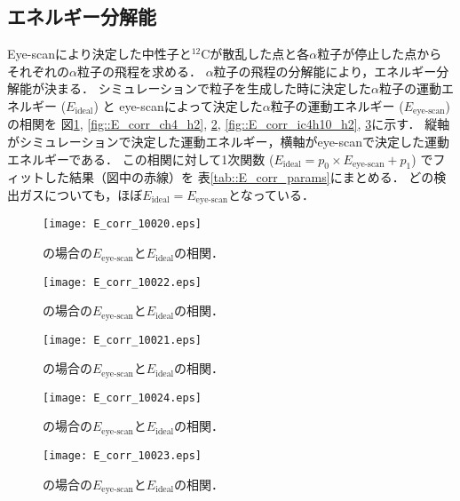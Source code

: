 \documentclass[../master]{subfiles}
\begin{document}
\subsection{エネルギー分解能}
Eye-scanにより決定した中性子と${}^{12}\mathrm{C}$が散乱した点と各$\alpha$粒子が停止した点から
それぞれの$\alpha$粒子の飛程を求める．
$\alpha$粒子の飛程の分解能により，エネルギー分解能が決まる．
シミュレーションで粒子を生成した時に決定した$\alpha$粒子の運動エネルギー ($E_{\text{ideal}}$) と
eye-scanによって決定した$\alpha$粒子の運動エネルギー ($E_{\text{eye-scan}}$) の相関を
図\ref{fig::E_corr_ch4}, \ref{fig::E_corr_ch4_h2}, \ref{fig::E_corr_ch4_he},
\ref{fig::E_corr_ic4h10_h2}, \ref{fig::E_corr_ic4h10_he}に示す．
縦軸がシミュレーションで決定した運動エネルギー，横軸がeye-scanで決定した運動エネルギーである．
この相関に対して1次関数 ($E_{\text{ideal}} = p_0\times E_{\text{eye-scan}}+p_1$) でフィットした結果（図中の赤線）を
表\ref{tab::E_corr_params}にまとめる．
どの検出ガスについても，ほぼ$E_{\text{ideal}} = E_{\text{eye-scan}}$となっている．
\begin{figure}
  \centering
  \begin{minipage}{0.45\columnwidth}
    \centering
    \texttt{[image: E\_corr\_10020.eps]}
    \caption{\Methane の場合の$E_{\text{eye-scan}}$と$E_{\text{ideal}}$の相関．}
    \label{fig::E_corr_ch4}
  \end{minipage}  
\end{figure}
\begin{figure}
  \centering
  \begin{minipage}{0.45\columnwidth}
    \centering
    \texttt{[image: E\_corr\_10022.eps]}
    \caption{\MethaneHydro の場合の$E_{\text{eye-scan}}$と$E_{\text{ideal}}$の相関．}
    \label{fig::E_corr_ch4_h2}
  \end{minipage}
  \begin{minipage}{0.45\columnwidth}
    \centering
    \texttt{[image: E\_corr\_10021.eps]}
    \caption{\MethaneHerium の場合の$E_{\text{eye-scan}}$と$E_{\text{ideal}}$の相関．}
    \label{fig::E_corr_ch4_he}
  \end{minipage}
\end{figure}
\begin{figure}
  \centering
  \begin{minipage}{0.45\columnwidth}
    \centering
    \texttt{[image: E\_corr\_10024.eps]}
    \caption{\isoButaneHydro の場合の$E_{\text{eye-scan}}$と$E_{\text{ideal}}$の相関．}
    \label{fig::E_corr_ic4h10_h2}
  \end{minipage}
  \begin{minipage}{0.45\columnwidth}
    \centering
    \texttt{[image: E\_corr\_10023.eps]}
    \caption{\isoButaneHerium の場合の$E_{\text{eye-scan}}$と$E_{\text{ideal}}$の相関．}
    \label{fig::E_corr_ic4h10_he}
  \end{minipage}
\end{figure}
\end{document}
